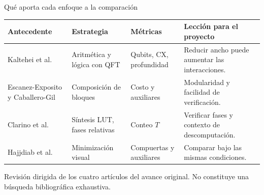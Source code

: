 \documentclass[aspectratio=169,12pt]{beamer}
\newcommand{\fuente}[1]{\vfill{\color{gris}\tiny #1\par}}
\begin{document}


\begin{frame}{Qué aporta cada enfoque a la comparación}
\small
\renewcommand{\arraystretch}{1.35}
\begin{tabular}{@{}>{\raggedright\arraybackslash}p{2.2cm}>{\raggedright\arraybackslash}p{3.2cm}>{\raggedright\arraybackslash}p{2.7cm}>{\raggedright\arraybackslash}p{4.3cm}@{}}
\toprule
\textbf{Antecedente} & \textbf{Estrategia} & \textbf{Métricas} & \textbf{Lección para el proyecto}\\\midrule
Kaltehei et al. & Aritmética y lógica con QFT & Qubits, CX, profundidad & Reducir ancho puede aumentar las interacciones.\\
Escanez-Exposito y Caballero-Gil & Composición de bloques & Costo y auxiliares & Modularidad y facilidad de verificación.\\
Clarino et al. & Síntesis LUT, fases relativas & Conteo $T$ & Verificar fases y contexto de descomputación.\\
Hajjdiab et al. & Minimización visual & Compuertas y auxiliares & Comparar bajo las mismas condiciones.\\
\bottomrule
\end{tabular}
\fuente{Revisión dirigida de los cuatro artículos del avance original. No constituye una búsqueda bibliográfica exhaustiva.}
\end{frame}
\end{document}
